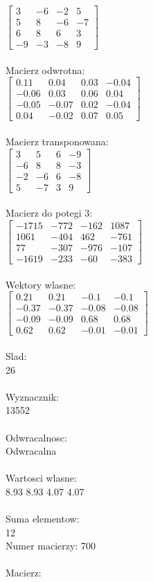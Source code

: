 \documentclass[a4paper,12pt]{article}
\begin{document}
$\begin{bmatrix} 3&-6&-2&5\\5&8&-6&-7\\6&8&6&3\\-9&-3&-8&9 \end{bmatrix}$
\\
\\
Macierz odwrotna:\\

$\begin{bmatrix} 0.11&0.04&0.03&-0.04\\-0.06&0.03&0.06&0.04\\-0.05&-0.07&0.02&-0.04\\0.04&-0.02&0.07&0.05 \end{bmatrix}$
\\
\\
Macierz transponowana:\\

$\begin{bmatrix} 3&5&6&-9\\-6&8&8&-3\\-2&-6&6&-8\\5&-7&3&9 \end{bmatrix}$
\\
\\
Macierz do potegi 3:\\

$\begin{bmatrix} -1715&-772&-162&1087\\1061&-404&462&-761\\77&-307&-976&-107\\-1619&-233&-60&-383 \end{bmatrix}$
\\
\\
Wektory wlasne:\\

$\begin{bmatrix} 0.21&0.21&-0.1&-0.1\\-0.37&-0.37&-0.08&-0.08\\-0.09&-0.09&0.68&0.68\\0.62&0.62&-0.01&-0.01 \end{bmatrix}$
\\
\\
Slad:\\
26
\\
\\
Wyznacznik:\\
13552
\\
\\
Odwracalnosc:\\
Odwracalna
\\
\\
Wartosci wlasne:\\
8.93 8.93 4.07 4.07
\\
\\
Suma elementow:\\
12
\\
\newpage
Numer macierzy:
700
\\
\\
Macierz:\\
\end{document}
